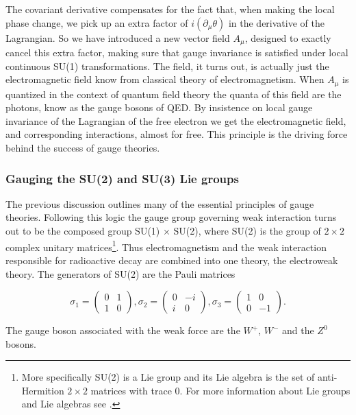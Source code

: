 The covariant derivative compensates for the fact that, when making the local phase change, we pick up an extra factor of $i (\partial_\mu \theta)$ in the derivative of the Lagrangian. So we have introduced a new vector field $A_\mu$, designed to exactly cancel this extra factor, making sure that gauge invariance is satisfied under local continuous SU(1) transformations. The field, it turns out, is actually just the electromagnetic field know from classical theory of electromagnetism. When $A_\mu$ is quantized in the context of quantum field theory the quanta of this field are the photons, know as the gauge bosons of QED. By insistence on local gauge invariance of the Lagrangian of the free electron we get the electromagnetic field, and corresponding interactions, almost for free. This principle is the driving force behind the success of gauge theories.

\subsubsection{Gauging the SU(2) and SU(3) Lie groups}
The previous discussion outlines many of the essential principles of gauge theories. Following this logic the gauge group governing weak interaction turns out to be the composed group SU(1) $\times$ SU(2), where SU(2) is the group of $2 \times 2$ complex unitary matrices\footnote{More specifically SU(2) is a Lie group and its Lie algebra is the set of anti-Hermition $2 \times 2$ matrices with trace 0. For more information about Lie groups and Lie algebras see  \cite{fulton1991rtf}.}. Thus electromagnetism and the weak interaction responsible for radioactive decay are combined into one theory, the electroweak theory. The generators of SU(2) are the Pauli matrices

\begin{equation}
	\sigma_1 =
	\begin{pmatrix}
	0&1\\
	1&0
	\end{pmatrix},
	\sigma_2 = 
	\begin{pmatrix}
	0&-i\\
	i&0
	\end{pmatrix},
	\sigma_3 = 
	\begin{pmatrix}
	1&0\\
	0&-1
	\end{pmatrix}.
\end{equation}

The gauge boson associated with the weak force are the $W^+$, $W^-$ and the $Z^0$ bosons.

